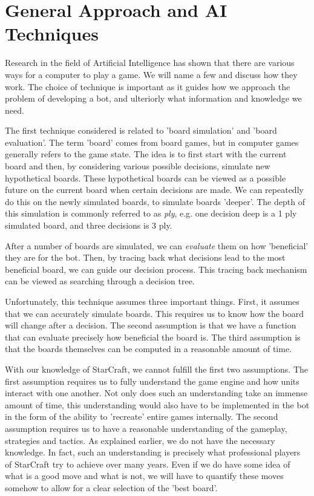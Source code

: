 \section{General Approach and AI Techniques}
\label{sec:techniques}

Research in the field of Artificial Intelligence has shown that there are various ways for a computer to play a game. We will name a few and discuss how they work. The choice of technique is important as it guides how we approach the problem of developing a bot, and ulteriorly what information and knowledge we need.


The first technique considered is related to 'board simulation' and 'board evaluation'. The term 'board' comes from board games, but in computer games generally refers to the game state. The idea is to first start with the current board and then, by considering various possible decisions, simulate new hypothetical boards. These hypothetical boards can be viewed as a possible future on the current board when certain decisions are made. We can repeatedly do this on the newly simulated boards, to simulate boards 'deeper'. The depth of this simulation is commonly referred to as \emph{ply}, e.g. one decision deep is a 1 ply simulated board, and three decisions is 3 ply.

After a number of boards are simulated, we can \emph{evaluate} them on how 'beneficial' they are for the bot. Then, by tracing back what decisions lead to the most beneficial board, we can guide our decision process. This tracing back mechanism can be viewed as searching through a decision tree.

Unfortunately, this technique assumes three important things. First, it assumes that we can accurately simulate boards. This requires us to know how the board will change after a decision. The second assumption is that we have a function that can evaluate precisely how beneficial the board is. The third assumption is that the boards themselves can be computed in a reasonable amount of time.

With our knowledge of StarCraft, we cannot fulfill the first two assumptions. The first assumption requires us to fully understand the game engine and how units interact with one another. Not only does such an understanding take an immense amount of time, this understanding would also have to be implemented in the bot in the form of the ability to 'recreate' entire games internally. The second assumption requires us to have a reasonable understanding of the gameplay, strategies and tactics. As explained earlier, we do not have the necessary knowledge. In fact, such an understanding is precisely what professional players of StarCraft try to achieve over many years. Even if we do have some idea of what is a good move and what is not, we will have to quantify these moves somehow to allow for a clear selection of the 'best board'.

